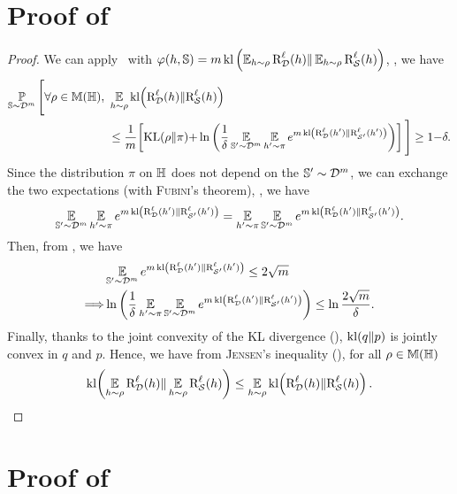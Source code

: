 \begin{noaddcontents}
\section{Proof of }
\label{ap:pac-bayes:sec:proof-seeger}

\seeger*
\begin{proof}
We can apply~ with  $\varphi(\h, \S)=\m\kl\LP\EE_{\h\sim\Q}\RiskLoss_{\D}(\h)\|\EE_{\h\sim\Q}\RiskLoss_{\dS}(\h)\RP$, \ie, we have
\begin{align*}
    \PP_{\S\sim\D^\m}\Bigg[\forall\Q\in\M(\H),\   &\EE_{\h\sim\Q}\kl\!\LP\RiskLoss_{\D}(\h)\|\RiskLoss_{\dS}(\h)\RP\\
    &\le \frac{1}{\m}\!\LB\KL(\Q\|\P){+}\ln\LP\frac{1}{\delta}\EE_{\S'\sim\D^\m}\EE_{\h'\sim\P}e^{\m\kl\LP\RiskLoss_{\D}(\h')\|\RiskLoss_{\dS'}(\h')\RP}\RP\RB\Bigg] \ge 1{-}\delta.
\end{align*}
Since the distribution $\pi$ on $\H$ does not depend on the $\S'\sim\D^\m$, we can exchange the two expectations (with \textsc{Fubini}'s theorem), \ie, we have 
\begin{align*}
\EE_{\S'\sim\D^\m}\EE_{\h'\sim\P}e^{\m\kl\LP\RiskLoss_{\D}(\h')\|\RiskLoss_{\dS'}(\h')\RP} = \EE_{\h'\sim\P}\EE_{\S'\sim\D^\m}e^{\m\kl\LP\RiskLoss_{\D}(\h')\|\RiskLoss_{\dS'}(\h')\RP}.
\end{align*}
Then, from , we have
\begin{align*}
    &\EE_{\S'\sim\D^\m}e^{\m\kl\LP\RiskLoss_{\D}(\h')\|\RiskLoss_{\dS'}(\h')\RP} \le 2\sqrt{\m}\\
    \Longrightarrow & \ln\LP\frac{1}{\delta}\EE_{\h'\sim\P}\EE_{\S'\sim\D^\m}e^{\m\kl\LP\RiskLoss_{\D}(\h')\|\RiskLoss_{\dS'}(\h')\RP}\RP \le \ln\frac{2\sqrt{\m}}{\delta}.
\end{align*}
Finally, thanks to the joint convexity of the KL divergence (), $\kl(q\|p)$ is jointly convex in $q$ and $p$.
Hence, we have from \textsc{Jensen}'s inequality (), for all $\Q\in\M(\H)$
\begin{align*}
\kl\!\LP\EE_{\h\sim\Q}\RiskLoss_{\D}(\h)\|\EE_{\h\sim\Q}\RiskLoss_{\dS}(\h)\RP \le \EE_{\h\sim\Q}\kl\!\LP\RiskLoss_{\D}(\h)\|\RiskLoss_{\dS}(\h)\RP.
\end{align*}
\end{proof}

\section{Proof of }
\label{ap:pac-bayes:sec:proof-representation-KL}


\end{noaddcontents}
